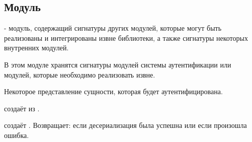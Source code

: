 \subsection{Модуль }\label{page-FPauth-core-module-FPauth+u+core-module-Auth+u+sign}%
 - модуль, содержащий сигнатуры других модулей, которые могут быть реализованы и интегрированы извне библиотеки, а также сигнатуры некоторых внутренних модулей.

В этом модуле хранятся сигнатуры модулей системы аутентификации или модулей, которые необходимо реализовать извне.

\label{page-FPauth-core-module-FPauth+u+core-module-Auth+u+sign-module-type-MODEL}\begin{ocamlindent}\label{page-FPauth-core-module-FPauth+u+core-module-Auth+u+sign-module-type-MODEL-type-t}\begin{ocamlindent}Некоторое представление сущности, которая будет аутентифицирована.\end{ocamlindent}%
\medbreak
\label{page-FPauth-core-module-FPauth+u+core-module-Auth+u+sign-module-type-MODEL-val-serialize}\begin{ocamlindent} создаёт  из \hyperref[page-FPauth-core-module-FPauth+u+core-module-Auth+u+sign-module-type-MODEL-type-t]{}.\end{ocamlindent}%
\medbreak
\label{page-FPauth-core-module-FPauth+u+core-module-Auth+u+sign-module-type-MODEL-val-deserialize}\begin{ocamlindent} создаёт \hyperref[page-FPauth-core-module-FPauth+u+core-module-Auth+u+sign-module-type-MODEL-type-t]{}. Возвращает:  если десериализация была успешна или  если произошла ошибка.\end{ocamlindent}%

\end{ocamlindent}
